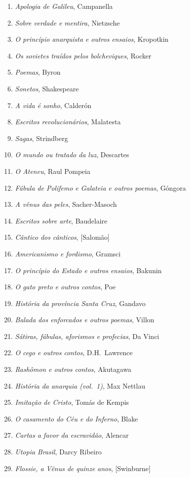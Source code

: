 \begin{enumerate}
\item \textit{Apologia de Galileu}, Campanella 
\item \textit{Sobre verdade e mentira}, Nietzsche
\item \textit{O princípio anarquista e outros ensaios}, Kropotkin
\item \textit{Os sovietes traídos pelos bolcheviques}, Rocker
\item \textit{Poemas}, Byron
\item \textit{Sonetos}, Shakespeare
\item \textit{A vida é sonho}, Calderón
\item \textit{Escritos revolucionários}, Malatesta
\item \textit{Sagas}, Strindberg
\item \textit{O mundo ou tratado da luz}, Descartes
\item \textit{O Ateneu}, Raul Pompeia
\item \textit{Fábula de Polifemo e Galateia e outros poemas}, Góngora
\item \textit{A vênus das peles}, Sacher{}-Masoch
\item \textit{Escritos sobre arte}, Baudelaire
\item \textit{Cântico dos cânticos}, [Salomão]
\item \textit{Americanismo e fordismo}, Gramsci
\item \textit{O princípio do Estado e outros ensaios}, Bakunin
\item \textit{O gato preto e outros contos}, Poe
\item \textit{História da província Santa Cruz}, Gandavo
\item \textit{Balada dos enforcados e outros poemas}, Villon
\item \textit{Sátiras, fábulas, aforismos e profecias}, Da Vinci
\item \textit{O cego e outros contos}, D.H.~Lawrence
\item \textit{Rashômon e outros contos}, Akutagawa
\item \textit{História da anarquia (vol.~1)}, Max Nettlau
\item \textit{Imitação de Cristo}, Tomás de Kempis
\item \textit{O casamento do Céu e do Inferno}, Blake
\item \textit{Cartas a favor da escravidão}, Alencar
\item \textit{Utopia Brasil}, Darcy Ribeiro
\item \textit{Flossie, a Vênus de quinze anos}, [Swinburne]

\end{enumerate}
